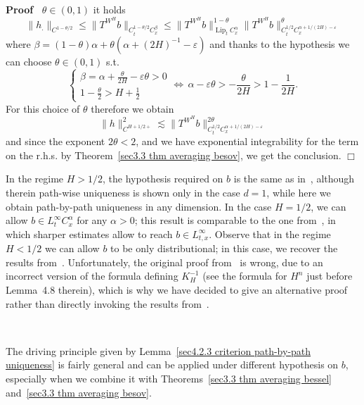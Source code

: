 \documentclass[10pt]{article}
\newcommand{\tmop}[1]{\ensuremath{\operatorname{#1}}}
\newenvironment{proof}{\noindent\textbf{Proof\ }}{\hspace*{\fill}$\Box$\medskip}
\begin{document}
\begin{proof}
  $\theta \in (0, 1)$ it holds
  \[ \| h_. \|_{C^{1 - \theta / 2}} \leqslant \| T^{W^H} b \|_{C^{1 - \theta /
     2}_t C^{\beta}_x} \leqslant \| T^{W^H} b \|^{1 - \theta}_{\tmop{Lip}_t
     C^{\alpha}_x}  \| T^{W^H} b \|^{\theta}_{C^{1 / 2}_t C^{\alpha + 1 / (2
     H) - \varepsilon}_x} \]
  where $\beta = (1 - \theta) \alpha + \theta (\alpha + (2 H)^{- 1} -
  \varepsilon)$ and thanks to the hypothesis we can choose $\theta \in (0, 1)$
  s.t.
  \[ \left\{\begin{array}{l}
       \beta = \alpha + \frac{\theta}{2 H} - \varepsilon \theta > 0\\
       1 - \frac{\theta}{2} > H + \frac{1}{2}
     \end{array}\right. \Longleftrightarrow \, \alpha - \varepsilon \theta > -
     \frac{\theta}{2 H} > 1 - \frac{1}{2 H} . \]
  For this choice of $\theta$ therefore we obtain
  \[ \| h \|_{C^{H + 1 / 2 +}}^2 \lesssim \| T^{W^H} b \|^{2 \theta}_{C^{1 /
     2}_t C^{\alpha + 1 / (2 H) - \varepsilon}_x} \]
  and since the exponent $2 \theta < 2$, and we have exponential integrability
  for the term on the r.h.s. by Theorem~\ref{sec3.3 thm averaging besov}, we
  get the conclusion.
\end{proof}

In the regime $H > 1 / 2$, the hypothesis required on $b$ is the same as
in~{\cite{nualartouknine}}, although therein path-wise uniqueness is shown
only in the case $d = 1$, while here we obtain path\mbox{-}by\mbox{-}path
uniqueness in any dimension. In the case $H = 1 / 2$, we can allow $b \in
L^{\infty}_t C^{\alpha}_x$ for any $\alpha > 0$; this result is comparable to
the one from~{\cite{davie}}, in which sharper estimates allow to reach $b \in
L^{\infty}_{t, x}$. Observe that in the regime $H < 1 / 2$ we can allow $b$ to
be only distributional; in this case, we recover the results
from~{\cite{catelliergubinelli}}. Unfortunately, the original proof
from~{\cite{catelliergubinelli}} is wrong, due to an incorrect version of the
formula defining $K_H^{- 1}$ (see the formula for $H^n$ just before Lemma~4.8
therein), which is why we have decided to give an alternative proof rather
than directly invoking the results from~{\cite{catelliergubinelli}}.

\

The driving principle given by Lemma~\ref{sec4.2.3 criterion path-by-path
uniqueness} is fairly general and can be applied under different hypothesis on
$b$, especially when we combine it with Theorems~\ref{sec3.3 thm averaging
bessel} and~\ref{sec3.3 thm averaging besov}.
\end{document}
